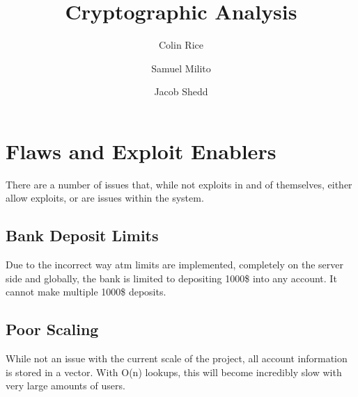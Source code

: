 \documentclass{article}
\begin{document}
\title{Cryptographic Analysis}
\author{Colin Rice
    \and Samuel Milito
    \and Jacob Shedd}

\maketitle

\section{Flaws and Exploit Enablers}
There are a number of issues that, while not exploits in and of themselves, either allow exploits, or are issues within the system.

\subsection{Bank Deposit Limits}
Due to the incorrect way atm limits are implemented, completely on the server side and globally, the bank is limited to depositing 1000\$ into any account. It cannot make multiple 1000\$ deposits.

\subsection{Poor Scaling}
While not an issue with the current scale of the project, all account information is stored in a vector. With O(n) lookups, this will become incredibly slow with very large amounts of users.
\end{document}
